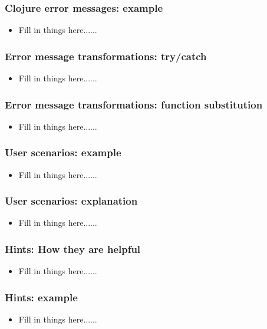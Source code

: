 \documentclass{beamer}
\begin{document}
\begin{frame}[fragile]
\frametitle{Clojure error messages: example}
	\begin{itemize}
  	 \item Fill in things here......
	 \end{itemize}
\end{frame}

\begin{frame}
\frametitle{Error message transformations: try/catch}
	\begin{itemize}
  	 \item Fill in things here......
	 \end{itemize}
\end{frame}

\begin{frame}
\frametitle{Error message transformations: function substitution}
	\begin{itemize}
  	 \item Fill in things here......
	 \end{itemize}
\end{frame}

\begin{frame}[fragile]
\frametitle{User scenarios: example}
	\begin{itemize}
  	 \item Fill in things here......
	 \end{itemize}
\end{frame}

\begin{frame}
\frametitle{User scenarios: explanation}
	\begin{itemize}
  	 \item Fill in things here......
	 \end{itemize}
\end{frame}

\begin{frame}
\frametitle{Hints: How they are helpful}
	\begin{itemize}
  	 \item Fill in things here......
	 \end{itemize}
\end{frame}

\begin{frame}
\frametitle{Hints: example}
	\begin{itemize}
  	 \item Fill in things here......
	 \end{itemize}
\end{frame}
\end{document}
